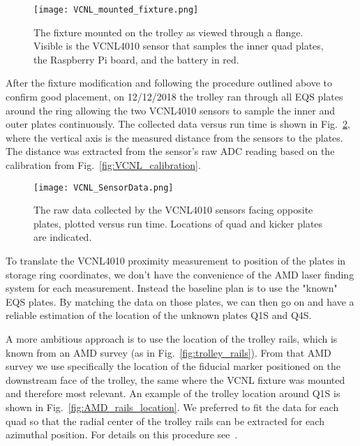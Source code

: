 \begin{figure}[]
	\centering
	\texttt{[image: VCNL\_mounted\_fixture.png]}
	\caption{The fixture mounted on the trolley as viewed through a flange. Visible is the VCNL4010 sensor that samples the inner quad plates, the Raspberry Pi board, and the battery in red. 
	}\label{fig:VCNL_mounted_fixture}
\end{figure}



After the fixture modification and following the procedure outlined above to confirm good placement, on 12/12/2018 the trolley ran through all EQS plates around the ring allowing the two VCNL4010 sensors to sample the inner and outer plates continuously.
The collected data versus run time is shown in Fig.~\ref{fig:VCNL_SensorData}, where the vertical axis is the measured distance from the sensors to the plates. 
The distance was extracted from the sensor's raw ADC reading based on the calibration from Fig.~\ref{fig:VCNL_calibration}.


\begin{figure}[]
	\centering
	\texttt{[image: VCNL\_SensorData.png]}
	\caption{The raw data collected by the VCNL4010 sensors facing opposite plates, plotted versus run time. Locations of quad and kicker plates are indicated.
	}\label{fig:VCNL_SensorData}
\end{figure}




To translate the VCNL4010 proximity measurement to position of the plates in storage ring coordinates, we don't have the convenience of the AMD laser finding system for each measurement. Instead the baseline plan is to use the "known" EQS plates. 
By matching the data on those plates, we can then go on and have a reliable estimation of the location of the unknown plates Q1S and Q4S.


A more ambitious approach is to use the location of the trolley rails, which is known from an AMD survey (as in Fig.~\ref{fig:trolley_rails}).
From that AMD survey we use specifically the location of the fiducial marker positioned on the downstream face of the trolley, the same where the VCNL fixture was mounted and therefore most relevant.
An example of the trolley location around Q1S is shown in Fig.~\ref{fig:AMD_rails_location}. We preferred to fit the data for each quad so that the radial center of the trolley rails can be extracted for each azimuthal position.
For details on this procedure see~\cite{Kargiantoulakis:doc15733}.

